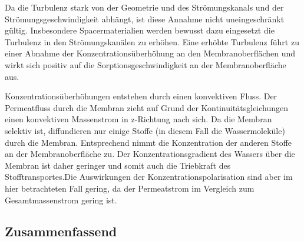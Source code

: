 \begin{normalsize}
\begin{LARGE}
Da die Turbulenz stark von der Geometrie und des Strömungskanals und der Strömungsgeschwindigkeit abhängt, ist diese Annahme nicht uneingeschränkt gültig. Insbesondere Spacermaterialien werden bewusst dazu eingesetzt die Turbulenz in den Strömungskanälen zu erhöhen.
Eine erhöhte Turbulenz führt zu einer Abnahme der Konzentrationsüberhöhung an den Membranoberflächen und wirkt sich positiv auf die Sorptionsgeschwindigkeit an der Membranoberfläche aus.  

  
Konzentrationsüberhöhungen entstehen durch einen konvektiven Fluss. Der Permeatfluss durch die Membran zieht auf Grund der Kontinuitätsgleichungen einen konvektiven Massenstrom in z-Richtung nach sich. Da die Membran selektiv ist, diffundieren nur einige Stoffe (in diesem Fall die Wassermoleküle) durch die Membran. Entsprechend nimmt die Konzentration der anderen Stoffe an der Membranoberfläche zu. Der Konzentrationsgradient des Wassers über die Membran ist daher geringer und somit auch die Triebkraft des Stofftransportes.Die Auswirkungen der Konzentrationspolarisation sind aber im hier betrachteten Fall gering, da der Permeatstrom im Vergleich zum Gesamtmassenstrom gering ist. 


\subsection{Zusammenfassend}


                                                                                               

\end{LARGE}
\end{normalsize}


























 